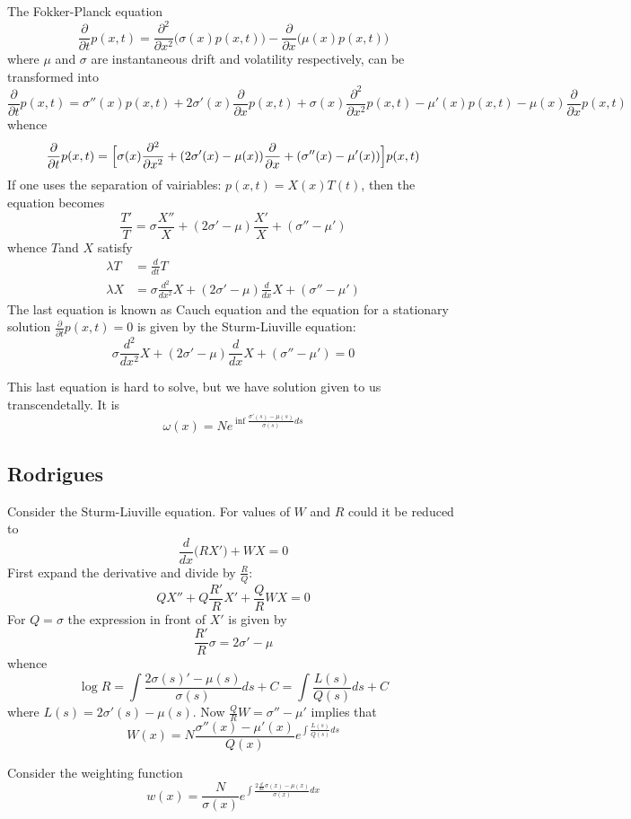 \documentclass[a4paper]{article}
\begin{document}
The Fokker-Planck equation
\[
\frac{\partial}{\partial t} p(x,t)
= \frac{\partial^2}{\partial x^2} \bigl(\sigma(x) p(x,t) \bigr) 
- \frac{\partial}{\partial x} \bigl(\mu(x) p(x,t) \bigr) 
\]
where $\mu$ and $\sigma$ are instantaneous drift and volatility respectively,
can be transformed into
\[
\frac{\partial}{\partial t} p(x,t)
= \sigma''(x) p(x,t)
	+ 2 \sigma'(x) \frac{\partial}{\partial x} p(x,t)
	+ \sigma(x) \frac{\partial^2}{\partial x^2} p(x,t) 
	- \mu'(x) p(x,t) - \mu(x) \frac{\partial}{\partial x} p(x,t) 
\]
whence
\[
\frac{\partial}{\partial t} p(x,t)
= \Bigl[\sigma(x) \frac{\partial^2}{\partial x^2}
	+ ( 2 \sigma'(x) - \mu(x) ) \frac{\partial}{\partial x}
	+ ( \sigma''(x) - \mu'(x) ) \Bigr] p(x,t)
\]
If one uses the separation of vairiables: $p(x,t) = X(x) T(t)$, then
the equation becomes
\[
\frac{T'}{T} = \sigma \frac{X''}{X} + ( 2 \sigma' - \mu ) \frac{X'}{X} + ( \sigma'' - \mu' )
\]
whence $T$and $X$ satisfy
\begin{align*}
	\lambda T &= \frac{d}{dt} T\\
	\lambda X &= \sigma \frac{d^2}{dx^2} X + (2\sigma'-\mu) \frac{d}{dx} X + (\sigma''-\mu')
\end{align*}
The last equation is known as Cauch equation and the equation for a stationary solution
$\frac{\partial}{\partial t}p(x,t) = 0$ is given by the Sturm-Liuville equation:
\[
\sigma \frac{d^2}{dx^2} X + (2\sigma'-\mu) \frac{d}{dx} X + (\sigma''-\mu') = 0
\]

This last equation is hard to solve, but we have solution given to us transcendetally. It is
\[
\omega(x) = N e^{\inf \frac{\sigma'(s)-\mu(s)}{\sigma(s)} ds}
\]

\subsection*{Rodrigues} %
\label{sub:rodrigues}
Consider the Sturm-Liuville equation. For values of $W$ and $R$ could it be reduced to
\[\frac{d}{dx} \bigl(R X'\bigr) + W X = 0\]
First expand the derivative and divide by $\frac{R}{Q}$:
\[QX'' + Q\frac{R'}{R}X' + \frac{Q}{R} W X = 0\]
For $Q = \sigma$ the expression in front of $X'$ is given by
\[\frac{R'}{R} \sigma = 2\sigma'-\mu\]
whence
\[
\log R
= \int \frac{2\sigma(s)'-\mu(s)}{\sigma(s)} ds + C
= \int \frac{L(s)}{Q(s)} ds + C\]
where $L(s) = 2 \sigma'(s) - \mu(s)$. Now $\frac{Q}{R} W = \sigma''-\mu'$ implies
that
\[W(x) = N \frac{\sigma''(x)-\mu'(x)}{Q(x)} e^{\int \frac{L(s)}{Q(s)} ds} \]

Consider the weighting function
\[w(x) = \frac{N}{\sigma(x)} e^{\int \frac{2\frac{d}{dx}\sigma(x) - \mu(x)}{\sigma(x)}dx}\]




\end{document}

